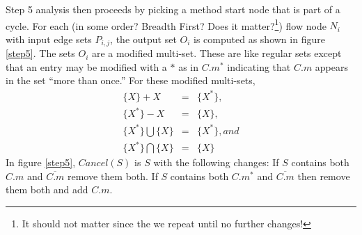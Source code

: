\documentclass[12pt]{article}%
\begin{document}
Step 5 analysis then proceeds by picking a method start node that is part of a cycle.
For each (in some order? Breadth First? Does it matter?\footnote{It should not matter since the we repeat until no further changes!}) flow node $N_i$ with input edge sets $P_{i,j}$, the output set $O_i$ is
computed as shown in figure \ref{step5}. The sets $O_i$ are a modified multi-set. These are like regular sets except that an entry may be modified with
a $*$ as in $C.m^*$ indicating that $C.m$ appears in the set ``more than once.'' For these modified multi-sets, 
\begin{eqnarray*}
\{X\} + X & = & \{X^*\},\\
\{X^*\} - X & = & \{X\},\\
\{X^*\} \bigcup \{X\} & = & \{X^*\}, and \\
\{X^*\} \bigcap \{X\} & = & \{X\}
\end{eqnarray*} 
In figure \ref{step5},  $Cancel(S)$ is $S$ with the following changes:\newline
If $S$ contains both $C.m$ and $\overline{C.m}$ remove them both.\newline
If $S$ contains both $C.m^*$ and $\overline{C.m}$ then remove them both and add $C.m$.

\end{document}
